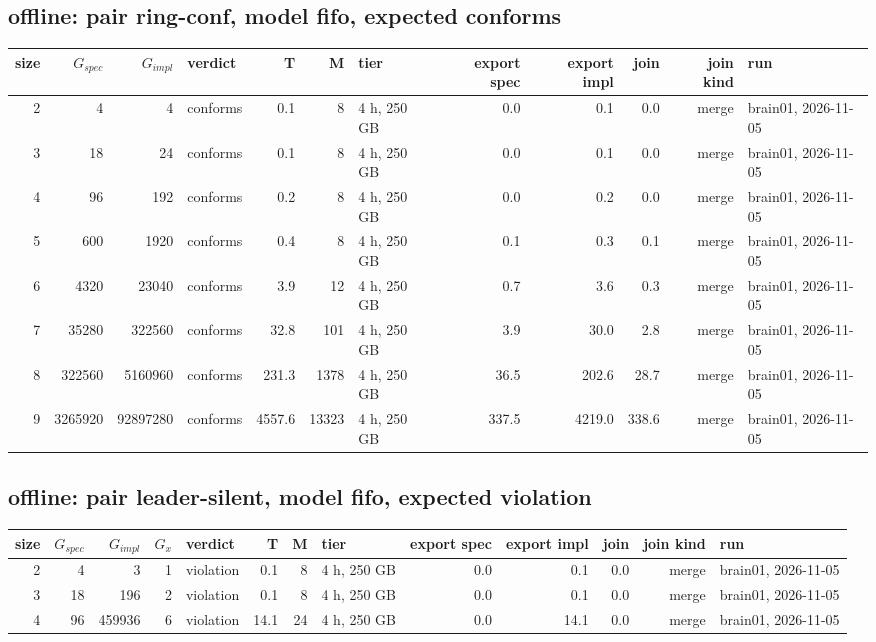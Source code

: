 \documentclass[10pt]{article}
\begin{document}
\subsection*{offline: pair \textsf{ring-conf}, model fifo, expected conforms}
\begin{longtable}{@{}rrrlrrlrrrrl@{}}
\toprule
size & $G_{\mathit{spec}}$ & $G_{\mathit{impl}}$ & verdict & T & M & tier & export spec & export impl & join & join kind & run \\
\midrule
\endhead
\color{blue} 2 & 4 & 4 & conforms & 0.1 & 8 & 4 h, 250 GB & 0.0 & 0.1 & 0.0 & merge & brain01, 2026-11-05 \\
\color{blue} 3 & 18 & 24 & conforms & 0.1 & 8 & 4 h, 250 GB & 0.0 & 0.1 & 0.0 & merge & brain01, 2026-11-05 \\
\color{blue} 4 & 96 & 192 & conforms & 0.2 & 8 & 4 h, 250 GB & 0.0 & 0.2 & 0.0 & merge & brain01, 2026-11-05 \\
\color{blue} 5 & 600 & 1920 & conforms & 0.4 & 8 & 4 h, 250 GB & 0.1 & 0.3 & 0.1 & merge & brain01, 2026-11-05 \\
\color{blue} 6 & 4320 & 23040 & conforms & 3.9 & 12 & 4 h, 250 GB & 0.7 & 3.6 & 0.3 & merge & brain01, 2026-11-05 \\
\color{blue} 7 & 35280 & 322560 & conforms & 32.8 & 101 & 4 h, 250 GB & 3.9 & 30.0 & 2.8 & merge & brain01, 2026-11-05 \\
\color{blue} 8 & 322560 & 5160960 & conforms & 231.3 & 1378 & 4 h, 250 GB & 36.5 & 202.6 & 28.7 & merge & brain01, 2026-11-05 \\
\color{blue} 9 & 3265920 & 92897280 & conforms & 4557.6 & 13323 & 4 h, 250 GB & 337.5 & 4219.0 & 338.6 & merge & brain01, 2026-11-05 \\
\bottomrule
\end{longtable}
\subsection*{offline: pair \textsf{leader-silent}, model fifo, expected violation}
\begin{longtable}{@{}rrrrlrrlrrrrl@{}}
\toprule
size & $G_{\mathit{spec}}$ & $G_{\mathit{impl}}$ & $G_x$ & verdict & T & M & tier & export spec & export impl & join & join kind & run \\
\midrule
\endhead
\color{blue} 2 & 4 & 3 & 1 & violation & 0.1 & 8 & 4 h, 250 GB & 0.0 & 0.1 & 0.0 & merge & brain01, 2026-11-05 \\
\color{blue} 3 & 18 & 196 & 2 & violation & 0.1 & 8 & 4 h, 250 GB & 0.0 & 0.1 & 0.0 & merge & brain01, 2026-11-05 \\
\color{blue} 4 & 96 & 459936 & 6 & violation & 14.1 & 24 & 4 h, 250 GB & 0.0 & 14.1 & 0.0 & merge & brain01, 2026-11-05 \\
\bottomrule
\end{longtable}
\end{document}
